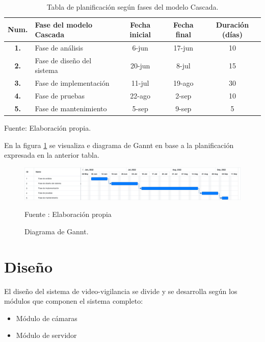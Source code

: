 \begin{table}[H]
    \caption{Tabla de planificación según fases del modelo Cascada.}
    \label{tabla:planning}
    \begin{center}
        \begin{tabular}{|c|l|c|c|c|}
            \hline
            \textbf{Num.} & \textbf{Fase del modelo Cascada}  &  \textbf{Fecha inicial} & \textbf{Fecha final} & \textbf{Duración (días)}\\ \hline
            \textbf{1.} & Fase de análisis        & 6-jun        & 17-jun        & 10        \\ \hline
            \textbf{2.} & Fase de diseño del sistema       & 20-jun        & 8-jul        & 15        \\ \hline
            \textbf{3.} & Fase de implementación        & 11-jul        & 19-ago        & 30        \\ \hline
            \textbf{4.} & Fase de pruebas        & 22-ago         &   2-sep     &    10     \\ \hline
            \textbf{5.} & Fase de mantenimiento        & 5-sep        & 9-sep        & 5        \\ \hline
        \end{tabular}
        \begin{center}            
            Fuente: Elaboración propia.
        \end{center}
    \end{center}
\end{table}

En la figura \ref{fig:gannt} se visualiza e diagrama de Gannt en base a la planificación expresada en la anterior tabla.
\begin{figure}[H]
    \begin{center}
        \includegraphics[width=18cm]{img/capitulo_4/gant.png}
    \end{center}
    \begin{center}
        \caption{Diagrama de Gannt.}
        Fuente : Elaboración propia
        \label{fig:gannt}
    \end{center}
\end{figure}

\section{Diseño}
El diseño del sistema de video-vigilancia se divide y se desarrolla según los módulos que componen el sistema completo:
\begin{itemize}
    \item Módulo de cámaras
    \item Módulo de servidor
\end{itemize}

